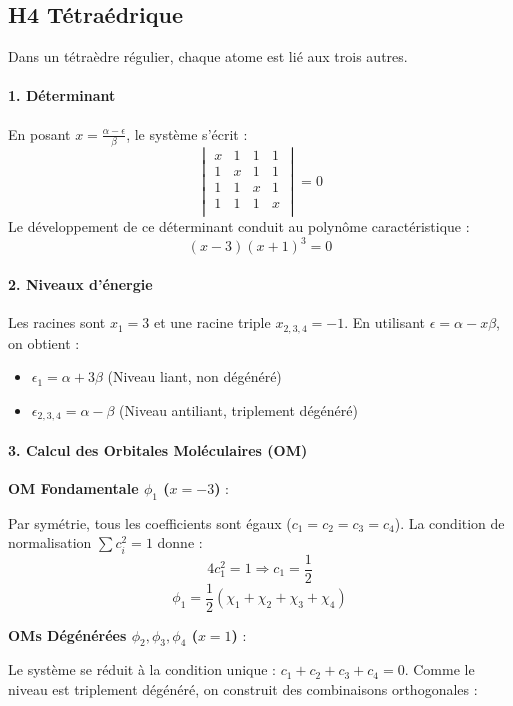 \documentclass[french]{yLectureNote}
\begin{document}
\subsection{H4 Tétraédrique}
Dans un tétraèdre régulier, chaque atome est lié aux trois autres.

\paragraph{1. Déterminant}
En posant $x = \frac{\alpha-\epsilon}{\beta}$, le système s'écrit :
\[
\begin{vmatrix}
x & 1 & 1 & 1 \\
1 & x & 1 & 1 \\
1 & 1 & x & 1 \\
1 & 1 & 1 & x \\
\end{vmatrix} = 0
\]
Le développement de ce déterminant conduit au polynôme caractéristique :
\[ (x-3)(x+1)^3 = 0 \]

\paragraph{2. Niveaux d'énergie}
Les racines sont $x_1 = 3$ et une racine triple $x_{2,3,4} = -1$. En utilisant $\epsilon = \alpha - x\beta$, on obtient :
\begin{itemize}
    \item $\epsilon_1 = \alpha + 3\beta$ (Niveau liant, non dégénéré)
    \item $\epsilon_{2,3,4} = \alpha - \beta$ (Niveau antiliant, triplement dégénéré)
\end{itemize}

\paragraph{3. Calcul des Orbitales Moléculaires (OM)}

\textbf{OM Fondamentale $\phi_1$ ($x = -3$)} :

Par symétrie, tous les coefficients sont égaux ($c_1=c_2=c_3=c_4$). La condition de normalisation $\sum c_i^2 = 1$ donne :
\[ 4c_1^2 = 1 \Rightarrow c_1 = \frac{1}{2} \]
\[ \phi_1 = \frac{1}{2}(\chi_1 + \chi_2 + \chi_3 + \chi_4) \]

\textbf{OMs Dégénérées $\phi_2, \phi_3, \phi_4$ ($x = 1$)} :

Le système se réduit à la condition unique : $c_1 + c_2 + c_3 + c_4 = 0$. Comme le niveau est triplement dégénéré, on construit des combinaisons orthogonales :
\end{document}
